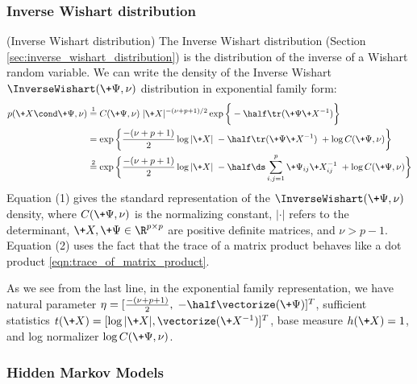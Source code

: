 \documentclass{article} %
\begin{document}
\subsubsection{Inverse Wishart distribution}

\begin{example}{(Inverse Wishart distribution)} 
\label{ex:inverse_wishart_as_ef} The Inverse Wishart distribution (Section \ref{sec:inverse_wishart_distribution}) is the distribution of the inverse of a Wishart random variable.   We can write the density of the Inverse Wishart $\InverseWishart(\+\Psi,  \nu)$ distribution in exponential family form:
\begin{align*}
p (\+X  \cond \+\Psi,  \nu) & \stackrel{1}{=} C(\+\Psi,  \nu) \; | \+X | ^{-(\nu + p + 1)/2} \exp \bigg\{ -\half \tr (\+\Psi \+X^{-1} ) \bigg\} \\
& = \exp \bigg\{ \frac{-(\nu + p + 1)}{2}  \log | \+ X | \;  -\half \tr (\+\Psi \+X^{-1} )  \; + \log  C(\+\Psi,  \nu)   \bigg\} \\
& \stackrel{2}{=} \exp \bigg\{ \frac{-(\nu + p + 1)}{2}  \log | \+ X | \;  -\half  \ds\sum_{i,j=1}^p \+\Psi_{ij} \+X^{-1}_{ij} \; + \log  C(\+\Psi,  \nu)   \bigg\} 
\end{align*}
Equation (1) gives the standard representation of the $\InverseWishart(\+\Psi,  \nu)$ density,  where   $C(\+\Psi,  \nu)$ is the normalizing constant,  $| \cdot |$ refers to the determinant,  $\+X,  \+\Psi \in \R^{p \times p}$ are positive definite matrices,  and $\nu > p-1$.    Equation (2) uses the fact that the trace of a matrix product behaves like a dot product \eqref{eqn:trace_of_matrix_product}.      


As we see from the last line,  in the exponential family representation,  we have natural parameter $\eta = [\frac{-(\nu + p + 1)}{2},  \; -\half \vectorize (\+\Psi)]^T$, sufficient statistics $t(\+X) = [\log | \+X | , \vectorize (\+X^{-1})]^T$, base measure $h(\+X)=1$, and log normalizer $ \log  C(\+\Psi,  \nu)$.   
  
\end{example} 


\subsubsection{Hidden Markov Models} 
\end{document}
